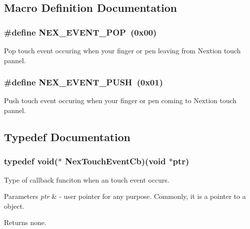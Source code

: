 \subsection{Macro Definition Documentation}
\hypertarget{group___touch_event_ga5db3d99f88ac878875ca47713b7a54b6}{
\subsubsection[{N\+E\+X\+\_\+\+E\+V\+E\+N\+T\+\_\+\+P\+O\+P}]{\setlength{\rightskip}{0pt plus 5cm}\#define N\+E\+X\+\_\+\+E\+V\+E\+N\+T\+\_\+\+P\+O\+P~(0x00)}}\label{group___touch_event_ga5db3d99f88ac878875ca47713b7a54b6}
Pop touch event occuring when your finger or pen leaving from Nextion touch pannel. \hypertarget{group___touch_event_ga748c37a9bbe04ddc680fe1686154fefb}{
\subsubsection[{N\+E\+X\+\_\+\+E\+V\+E\+N\+T\+\_\+\+P\+U\+S\+H}]{\setlength{\rightskip}{0pt plus 5cm}\#define N\+E\+X\+\_\+\+E\+V\+E\+N\+T\+\_\+\+P\+U\+S\+H~(0x01)}}\label{group___touch_event_ga748c37a9bbe04ddc680fe1686154fefb}
Push touch event occuring when your finger or pen coming to Nextion touch pannel. 

\subsection{Typedef Documentation}
\hypertarget{group___touch_event_ga162dea47b078e8878d10d6981a9dd0c6}{
\subsubsection[{Nex\+Touch\+Event\+Cb}]{\setlength{\rightskip}{0pt plus 5cm}typedef void($\ast$ Nex\+Touch\+Event\+Cb)(void $\ast$ptr)}}\label{group___touch_event_ga162dea47b078e8878d10d6981a9dd0c6}
Type of callback funciton when an touch event occurs.


\begin{DoxyParams}{Parameters}
{\em ptr} & -\/ user pointer for any purpose. Commonly, it is a pointer to a object. \\
\hline
\end{DoxyParams}
\begin{DoxyReturn}{Returns}
none. 
\end{DoxyReturn}
